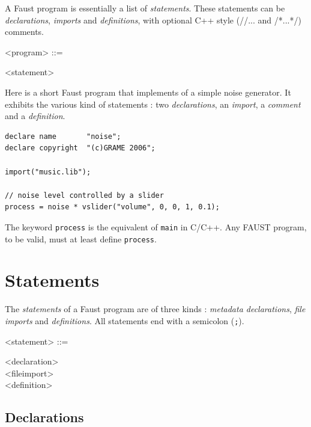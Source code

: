 \documentclass[a4paper]{book}
\begin{document}
A Faust program is essentially a list of \textit{statements}. These statements can be \textit{declarations}, \textit{imports} and \textit{definitions}, with optional C++ style (//... and /*...*/) comments.
 
\begin{grammar}
  <program> ::= 
  \begin{syntdiag}
    \begin{rep}
      <statement>
    \end{rep}
  \end{syntdiag}
\end{grammar}

Here is a short Faust program that implements of a simple noise generator. It exhibits the various kind of statements : two \textit{declarations}, an \textit{import}, a \textit{comment} and a \textit{definition}.

\begin{lstlisting}
declare name       "noise";
declare copyright  "(c)GRAME 2006";

import("music.lib");

// noise level controlled by a slider
process = noise * vslider("volume", 0, 0, 1, 0.1);
\end{lstlisting}
 
The keyword \lstinline'process' is the equivalent of \lstinline'main' in C/C++. Any FAUST program, to be valid, must at least define \lstinline'process'.


\section{Statements}

The \textit{statements} of a Faust program are of three kinds : \textit{metadata declarations}, \textit{file imports} and \textit{definitions}. All statements end with a semicolon (\lstinline';'). 

\begin{grammar}
  <statement> ::= 
  \begin{syntdiag}
    \begin{stack}
      <declaration>\\
      <fileimport>\\
      <definition>
    \end{stack}
  \end{syntdiag}
\end{grammar}


\subsection{Declarations}
\end{document}
